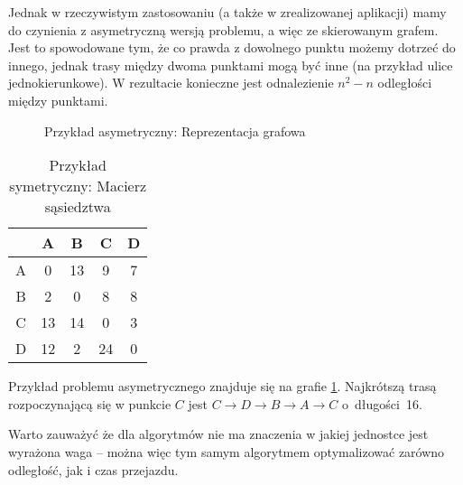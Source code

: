 Jednak w rzeczywistym zastosowaniu (a także w zrealizowanej aplikacji) mamy do czynienia z asymetryczną wersją problemu, a więc ze skierowanym grafem. Jest to spowodowane tym, że co prawda z dowolnego punktu możemy dotrzeć do innego, jednak trasy między dwoma punktami mogą być inne (na przykład ulice jednokierunkowe). W rezultacie konieczne jest odnalezienie $n^2-n$ odległości między punktami.
\begin{figure}
	\centering
	\def\svgwidth{\columnwidth}
	
	\caption{Przykład asymetryczny: Reprezentacja grafowa}
	\label{fig:przyklad2_komiwojazer_graf}
\end{figure}

\begin{table}
	\begin{center}
		\begin{tabular}
			{  c | c c c c }
			& A & B & C & D \\
			\hline
			A & 0  & 13 & 9  &  7 \\
			B & 2  & 0  & 8  &  8 \\
			C & 13 & 14 & 0  &  3 \\
			D & 12 & 2  & 24 &  0 \\
		\end{tabular}
	\end{center}
	\caption{Przykład symetryczny: Macierz sąsiedztwa}
\end{table}

Przykład problemu asymetrycznego znajduje się na grafie \ref{fig:przyklad2_komiwojazer_graf}. Najkrótszą trasą rozpoczynającą się w punkcie $C$ jest $C \to D \to B \to A \to C$ o~długości~16.

Warto zauważyć że dla algorytmów nie ma znaczenia w jakiej jednostce jest wyrażona waga -- można więc tym samym algorytmem optymalizować zarówno odległość, jak i czas przejazdu.